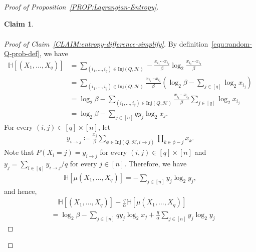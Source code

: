 \documentclass[11pt,a4paper]{article}
\newtheorem{claim}[definition]{Claim}
\begin{document}
\begin{proof}[Proof of Proposition~\ref{PROP:Lagrangian-Entropy}]
\begin{claim}
\begin{align*}
        \end{align*}
    \end{claim}
    \begin{proof}[Proof of Claim~\ref{CLAIM:entropy-difference-simplify}]
        By definition~\eqref{equ:random-Q-prob-def}, we have 
        \begin{align*}
            \mathbb{H}[(X_1, \ldots, X_{q})]
            & = \sum_{(i_1, \ldots, i_{q}) \in \mathrm{Inj}(Q,\mathcal{H})} - \frac{x_{i_1} \cdots x_{i_q}}{\beta} \log_{2} \frac{x_{i_1} \cdots x_{i_q}}{\beta} \\
            & = \sum_{(i_1, \ldots, i_{q}) \in \mathrm{Inj}(Q,\mathcal{H})} \frac{x_{i_1} \cdots x_{i_q}}{\beta} \left( \log_{2} \beta - \sum_{j\in [q]} \log_{2}x_{i_j} \right) \\
            & = \log_{2}\beta - \sum_{(i_1, \ldots, i_{q}) \in \mathrm{Inj}(Q,\mathcal{H})} \frac{x_{i_1} \cdots x_{i_q}}{\beta} \sum_{j\in [q]} \log_{2}x_{i_j} \\
            & = \log_{2}\beta - \sum_{j\in [n]} q y_{j} \log_{2} x_j. 
        \end{align*}
        For every $(i,j) \in [q] \times [n]$, let 
        \begin{align*}
             y_{i \to j}
            \coloneqq \frac{x_j}{\beta} \sum_{\phi \in \mathrm{Inj}(Q,\mathcal{H}, i \to j)} \prod_{k\in \phi - j} x_k. 
        \end{align*}
        Note that $P(X_i = j) = y_{i \to j}$ for every $(i,j) \in [q] \times [n]$ and $y_j = \sum_{i \in [q]}y_{i\to j}/q$ for every $j \in [n]$. 
        Therefore, we have 
        \begin{align*}
            \mathbb{H}[\mu(X_{1}, \ldots, X_q)]
            = - \sum_{j \in [n]} y_j \log_2 y_j, 
        \end{align*}
        and hence, 
        \begin{align*}
            & \quad \mathbb{H}\left[ (X_1, \ldots, X_{q}) \right] - \frac{q}{\alpha}  \mathbb{H}[\mu(X_{1}, \ldots, X_q)] \\
            & = \log_{2}\beta - \sum_{j\in [n]} q y_{j} \log_{2} x_j + \frac{q}{\alpha}\sum_{j \in [n]} y_j \log_2 y_j 

\end{align*}
\end{proof}
\end{proof}
\end{document}

